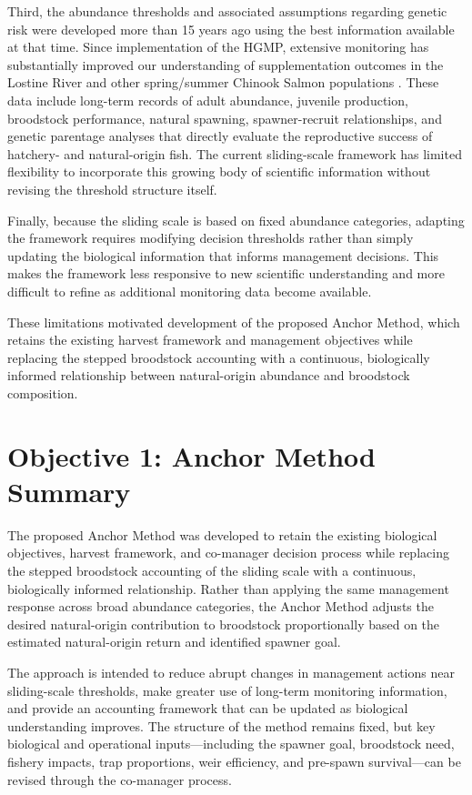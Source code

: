 \documentclass[12pt,letterpaper]{article}
\begin{document}
Third, the abundance thresholds and associated assumptions regarding genetic risk were developed more than 15 years ago using the best information available at that time. Since implementation of the HGMP, extensive monitoring has substantially improved our understanding of supplementation outcomes in the Lostine River and other spring/summer Chinook Salmon populations \autocite{hess_supportive_2012,janowitzkoch_long-term_2019}. These data include long-term records of adult abundance, juvenile production, broodstock performance, natural spawning, spawner-recruit relationships, and genetic parentage analyses that directly evaluate the reproductive success of hatchery- and natural-origin fish. The current sliding-scale framework has limited flexibility to incorporate this growing body of scientific information without revising the threshold structure itself.

Finally, because the sliding scale is based on fixed abundance categories, adapting the framework requires modifying decision thresholds rather than simply updating the biological information that informs management decisions. This makes the framework less responsive to new scientific understanding and more difficult to refine as additional monitoring data become available.

These limitations motivated development of the proposed Anchor Method, which retains the existing harvest framework and management objectives while replacing the stepped broodstock accounting with a continuous, biologically informed relationship between natural-origin abundance and broodstock composition.

\section{Objective 1: Anchor Method Summary}\label{sec:obj1}

The proposed Anchor Method was developed to retain the existing biological objectives, harvest framework, and co-manager decision process while replacing the stepped broodstock accounting of the sliding scale with a continuous, biologically informed relationship. Rather than applying the same management response across broad abundance categories, the Anchor Method adjusts the desired natural-origin contribution to broodstock proportionally based on the estimated natural-origin return and identified spawner goal.

The approach is intended to reduce abrupt changes in management actions near sliding-scale thresholds, make greater use of long-term monitoring information, and provide an accounting framework that can be updated as biological understanding improves. The structure of the method remains fixed, but key biological and operational inputs---including the spawner goal, broodstock need, fishery impacts, trap proportions, weir efficiency, and pre-spawn survival---can be revised through the co-manager process.
\end{document}

